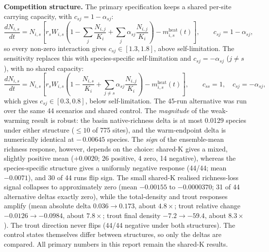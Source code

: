\documentclass[11pt,a4paper]{article}
\begin{document}
\textbf{Competition structure.} The primary specification keeps a shared per-site carrying capacity, with $c_{sj}=1-\alpha_{sj}$:
\begin{equation}
\frac{dN_{i,s}}{dt}=N_{i,s}\left[r_sW_{i,s}\left(1-\sum_j\frac{N_{i,j}}{K_i}+\sum_j\alpha_{sj}\frac{N_{i,j}}{K_i}\right)-m^{\mathrm{heat}}_{i,s}(t)\right],
\qquad c_{sj}=1-\alpha_{sj},
\label{eq:competition}
\end{equation}
so every non-zero interaction gives $c_{sj}\in[1.3,1.8]$, above self-limitation. The sensitivity replaces this with species-specific self-limitation and $c_{sj}=-\alpha_{sj}$ ($j\neq s$), with no shared capacity:
\begin{equation}
\frac{dN_{i,s}}{dt}=N_{i,s}\left[r_sW_{i,s}\left(1-\frac{N_{i,s}}{K_i}+\sum_{j\neq s}\alpha_{sj}\frac{N_{i,j}}{K_i}\right)-m^{\mathrm{heat}}_{i,s}(t)\right],
\qquad c_{ss}=1,\quad c_{sj}=-\alpha_{sj},
\end{equation}
which gives $c_{sj}\in[0.3,0.8]$, below self-limitation. The 45-run alternative was run over the same 44 scenarios and shared control. The \emph{magnitude} of the weak-warming result is robust: the basin native-richness delta is at most 0.0129 species under either structure ($\le10$ of 775 sites), and the warm-endpoint delta is numerically identical at $-\,0.00645$ species. The \emph{sign} of the ensemble-mean richness response, however, depends on the choice: shared-K gives a mixed, slightly positive mean ($+0.0020$; 26 positive, 4 zero, 14 negative), whereas the species-specific structure gives a uniformly negative response (44/44; mean $-0.0071$), and 30 of 44 runs flip sign. The small shared-K realised richness-loss signal collapses to approximately zero (mean $-0.00155$ to $-0.0000370$; 31 of 44 alternative deltas exactly zero), while the total-density and trout responses amplify (mean absolute delta $0.036\to0.173$, about $4.8\times$; trout relative change $-0.0126\to-0.0984$, about $7.8\times$; trout final density $-7.2\to-59.4$, about $8.3\times$). The trout direction never flips (44/44 negative under both structures). The control states themselves differ between structures, so only the deltas are compared. All primary numbers in this report remain the shared-K results.
\end{document}

